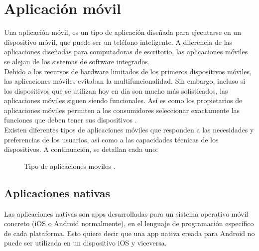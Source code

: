 
\section{Aplicación móvil}
Una aplicación móvil, es un tipo de aplicación diseñada para ejecutarse en un dispositivo móvil, que puede ser un teléfono inteligente. A  diferencia de las aplicaciones diseñadas para computadoras de escritorio, las aplicaciones móviles se alejan de los sistemas de software integrados. \\

Debido a los recursos de hardware limitados de los primeros dispositivos móviles, las aplicaciones móviles evitaban la multifuncionalidad. Sin embargo, incluso si los dispositivos que se utilizan hoy en día son mucho más sofisticados, las aplicaciones móviles siguen siendo funcionales. Así es como los propietarios de aplicaciones móviles permiten a los consumidores seleccionar exactamente las funciones que deben tener sus dispositivos \cite{IM1}. \\

Existen diferentes tipos de aplicaciones móviles que responden a las necesidades y preferencias de los usuarios, así como a las capacidades técnicas de los dispositivos. A continuación, se detallan cada uno:

\begin{figure}[htbp]
	\begin{center}
		\caption{Tipo de aplicaciones moviles \cite{IM1}.}
		\label{fig:casosDeUso}
	\end{center}
\end{figure}

\subsection{Aplicaciones nativas}
Las aplicaciones nativas son apps desarrolladas para un sistema operativo móvil concreto (iOS o Android normalmente), en el lenguaje de programación específico de cada plataforma. Esto quiere decir que una app nativa creada para Android no puede ser utilizada en un dispositivo iOS y viceversa. \\

